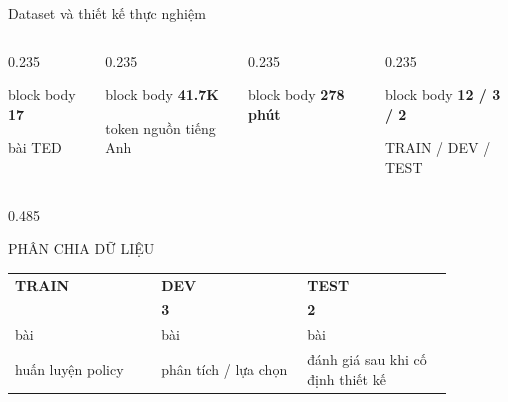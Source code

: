 \documentclass[aspectratio=169,11pt]{beamer}
\begin{document}
\begin{frame}{Dataset và thiết kế thực nghiệm}
  \begin{columns}[T,onlytextwidth]
    \begin{column}{0.235\textwidth}
      \begin{beamercolorbox}[rounded=true,sep=0.45em,center]{block body}
        {\LARGE\bfseries\color{TimelyBlue}17}\par
        \scriptsize bài TED
      \end{beamercolorbox}
    \end{column}
    \begin{column}{0.235\textwidth}
      \begin{beamercolorbox}[rounded=true,sep=0.45em,center]{block body}
        {\LARGE\bfseries\color{TimelyBlue}41.7K}\par
        \scriptsize token nguồn tiếng Anh
      \end{beamercolorbox}
    \end{column}
    \begin{column}{0.235\textwidth}
      \begin{beamercolorbox}[rounded=true,sep=0.45em,center]{block body}
        {\LARGE\bfseries\color{TimelyBlue}278 phút}\par
        \scriptsize 
      \end{beamercolorbox}
    \end{column}
    \begin{column}{0.235\textwidth}
      \begin{beamercolorbox}[rounded=true,sep=0.45em,center]{block body}
        {\LARGE\bfseries\color{TimelyBlue}12 / 3 / 2}\par
        \scriptsize TRAIN / DEV / TEST
      \end{beamercolorbox}
    \end{column}
  \end{columns}

  \vspace{0.35em}
  \begin{columns}[T,onlytextwidth]
    \begin{column}{0.485\textwidth}
      \begin{block}{PHÂN CHIA DỮ LIỆU}
        \centering
        \begin{tabular}{@{}>{\centering\arraybackslash}p{0.29\linewidth}>{\centering\arraybackslash}p{0.29\linewidth}>{\centering\arraybackslash}p{0.29\linewidth}@{}}
          \textbf{TRAIN} & \textbf{DEV} & \textbf{TEST} \\
          {\Large\color{TimelyBlue}\textbf{12}} & {\Large\color{TimelyBlue}\textbf{3}} & {\Large\color{TimelyBlue}\textbf{2}} \\
          \scriptsize bài & \scriptsize bài & \scriptsize bài \\
          \scriptsize huấn luyện policy & \scriptsize phân tích / lựa chọn & \scriptsize đánh giá sau khi cố định thiết kế
        \end{tabular}


\end{block}
\end{column}
\end{columns}
\end{frame}
\end{document}
